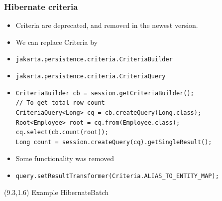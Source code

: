 \documentclass[10pt,xcolor=pdflatex]{beamer}
\begin{document}
\begin{frame}[fragile]\frametitle{Hibernate criteria}
	\begin{itemize}
		\item Criteria are deprecated, and removed in the newest version.
        \item We can replace Criteria by
        \item[] \texttt{jakarta.persistence.criteria.CriteriaBuilder}
        \item[] \texttt{jakarta.persistence.criteria.CriteriaQuery}
        \item[] \footnotesize
                \lstset{language=Java}
                \begin{lstlisting}   
CriteriaBuilder cb = session.getCriteriaBuilder();
// To get total row count
CriteriaQuery<Long> cq = cb.createQuery(Long.class);
Root<Employee> root = cq.from(Employee.class);
cq.select(cb.count(root));
Long count = session.createQuery(cq).getSingleResult();        
                \end{lstlisting}  
                \normalsize  
        \item Some functionality was removed
        \item[] {\footnotesize \verb+query.setResultTransformer(Criteria.ALIAS_TO_ENTITY_MAP);+}
	\end{itemize}
\begin{textblock}{15}(9.3,1.6)
    {\footnotesize Example HibernateBatch}
\end{textblock}
\end{frame}
\end{document}
